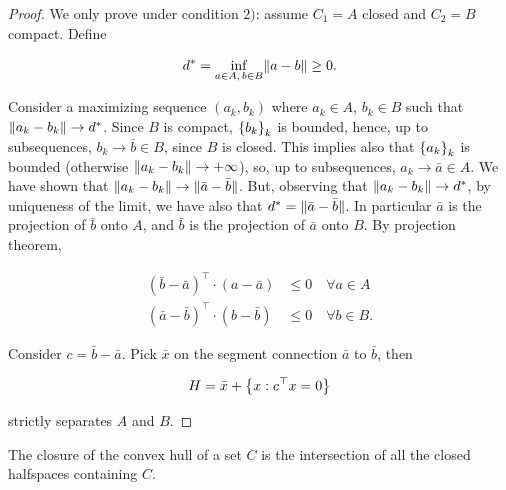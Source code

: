 \begin{proof}
    
    We only prove under condition $2)$: assume $C_1 = A$ closed and $C_2 = B$ compact. Define 

    \[ d^* = \inf_{a \in A,\, b \in B} \lVert a-b \rVert \ge 0. \]

    Consider a maximizing sequence $(a_k,b_k)$ where $a_k \in A$, $b_k \in B$ such that $\lVert a_k - b_k \rVert \to d^*$. Since $B$ is compact, $\left\{ b_k \right\}_k$ is bounded, hence, up to subsequences, $b_k \to \bar{b} \in B$, since $B$ is closed. This implies also that $\left\{ a_k \right\}_k$ is bounded (otherwise $\lVert a_k - b_k \rVert \to +\infty$), so, up to subsequences, $a_k \to \bar{a} \in A$. We have shown that $\lVert a_k - b_k \rVert \to \lVert \bar{a} - \bar{b} \rVert$. But, observing that $\lVert a_k - b_k \rVert \to d^*$, by uniqueness of the limit, we have also that $d^* = \lVert \bar{a} - \bar{b} \rVert$. In particular $\bar{a}$ is the projection of $\bar{b}$ onto $A$, and $\bar{b}$ is the projection of $\bar{a}$ onto $B$. By projection theorem, 

    \begin{align*}
        (\bar{b} - \bar{a})^\top \cdot (a - \bar{a}) &\le 0 \quad \forall a \in A \\
        (\bar{a} - \bar{b})^\top \cdot (b - \bar{b}) &\le 0 \quad \forall b \in B.
    \end{align*}

    Consider $c = \bar{b} - \bar{a}$. Pick $\bar{x}$ on the segment connection $\bar{a}$ to $\bar{b}$, then 

    \[ H = \bar{x} + \left\{ x : c^\top x = 0 \right\} \]

    strictly separates $A$ and $B$.

\end{proof}

\begin{proposition}[Book 1.5.4]

    The closure of the convex hull of a set $C$ is the intersection of all the closed halfspaces containing $C$.

\end{proposition}

